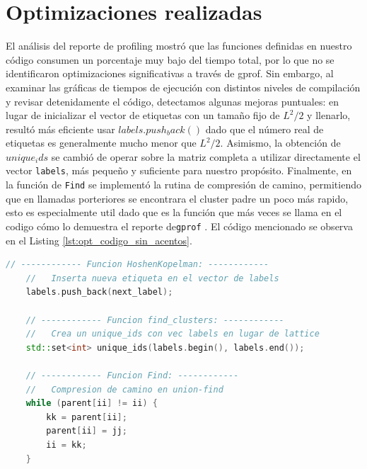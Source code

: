 \documentclass{article}
\begin{document}
\section{Optimizaciones realizadas}

El análisis del reporte de profiling mostró que las funciones definidas en nuestro código consumen un porcentaje muy bajo del tiempo total, por lo que no se identificaron optimizaciones significativas a través de gprof. Sin embargo, al examinar las gráficas de tiempos de ejecución con distintos niveles de compilación y revisar detenidamente el código, detectamos algunas mejoras puntuales: en lugar de inicializar el vector de etiquetas con un tamaño fijo de \(L^2/2\) y llenarlo, resultó más eficiente usar \texttt{$labels.push_back()$} dado que el número real de etiquetas es generalmente mucho menor que \(L^2/2\). Asimismo, la obtención de \texttt{$unique_ids$} se cambió de operar sobre la matriz completa a utilizar directamente el vector \texttt{labels}, más pequeño y suficiente para nuestro propósito. Finalmente, en la función de \texttt{Find} se implementó la rutina de compresión de camino, permitiendo que en llamadas porteriores se encontrara el cluster padre un poco más rapido, esto es especialmente util dado que es la función que más veces se llama en el codigo cómo lo demuestra el reporte de\texttt{gprof} . El código mencionado se observa en el Listing \ref{lst:opt_codigo_sin_acentos}. 
 
\begin{lstlisting}[language=C++,caption={Codigo de optimizaciones}, label={lst:opt_codigo_sin_acentos}]
    // ------------ Funcion HoshenKopelman: ------------
    //   Inserta nueva etiqueta en el vector de labels
    labels.push_back(next_label);
    
    // ------------ Funcion find_clusters: ------------
    //   Crea un unique_ids con vec labels en lugar de lattice 
    std::set<int> unique_ids(labels.begin(), labels.end()); 

    // ------------ Funcion Find: ------------
    //   Compresion de camino en union-find
    while (parent[ii] != ii) {
        kk = parent[ii];
        parent[ii] = jj;
        ii = kk;
    }
\end{lstlisting}
\end{document}
